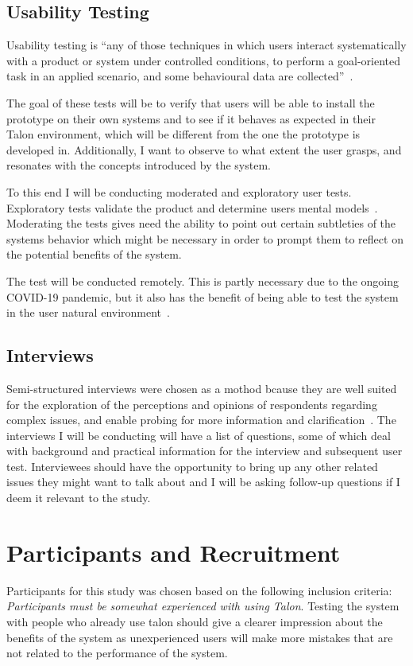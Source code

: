 \documentclass[../thesis.tex]{subfiles}
\begin{document}
\subsection{Usability Testing}
Usability testing is ``any of those
techniques in which users interact systematically with a product or system under
controlled conditions, to perform a goal-oriented task in an applied scenario, and
some behavioural data are collected''~\parencite{wichansky2000usability}.

The goal of these tests will be to verify that users will be able to install the prototype
on their own systems and to see if it behaves as expected in their Talon environment, which will be different from
the one the prototype is developed in.
Additionally, I want to observe to what extent the user grasps, and resonates with the concepts introduced by the system.

To this end I will be conducting moderated and exploratory user tests.
Exploratory tests validate the product and determine users mental models~\parencite{vasalou2004human}.
Moderating the tests gives need the ability to point out certain subtleties of the systems behavior
which might be necessary in order to prompt them to reflect on the potential benefits of the system.

The test will be conducted remotely.
This is partly necessary due to the ongoing COVID-19 pandemic, but it also has the
benefit of being able to test the system in the user natural environment~\parencite{vasalou2004human}.

\subsection{Interviews}
Semi-structured interviews were chosen as a mothod bcause they are  well  suited  for  the  exploration  of  the perceptions and opinions of  respondents regarding complex issues, and enable probing for more information and clarification~\parencite{louise1994collecting}.
The interviews I will be conducting will have a list of questions, some of which deal with background and practical information for the interview and subsequent user test.
Interviewees should have the opportunity to bring up any other related issues they might want to talk about and I will be asking follow-up questions
if I deem it relevant to the study.

\section{Participants and Recruitment}
Participants for this study was chosen based on the following inclusion criteria:
\textit{Participants must be somewhat experienced with using Talon}.
Testing the system with people who already use talon should give a clearer impression
about the benefits of the system as unexperienced users will make more mistakes that are not 
related to the performance of the system.
\end{document}
